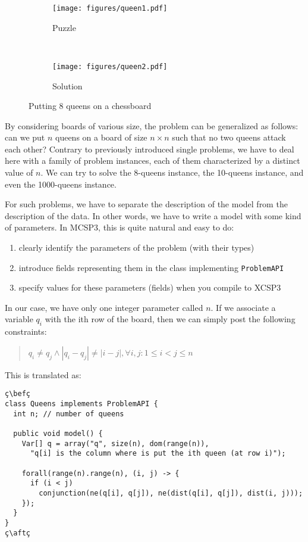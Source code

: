 \documentclass[10pt]{article}
\def\xt{{\rm XCSP3}\xspace}
\newcommand{\nn}[1]{{\tt #1}} %
\def\mt{{\rm MCSP3}\xspace}
\def\xt{{\rm XCSP3}\xspace}
\def\bef{\rule{10cm}{0.1mm}} %
\def\aft{\rule{10cm}{0.1mm}\medskip}
\begin{document}
\begin{figure}[h]
  \centering
    \begin{subfigure}[t]{0.5\textwidth}
        \centering
        \texttt{[image: figures/queen1.pdf]}
        \caption{Puzzle}
    \end{subfigure}%
    ~ 
    \begin{subfigure}[t]{0.5\textwidth}
        \centering
        \texttt{[image: figures/queen2.pdf]}
        \caption{Solution}
    \end{subfigure}
    \caption{Putting 8 queens on a chessboard \label{fig:queens}}
\end{figure}

By considering boards of various size, the problem can be generalized as follows: can we put $n$ queens on a board of size $n \times n$ such that no two queens attack each other?
Contrary to previously introduced single problems, we have to deal here with a family of problem instances, each of them characterized by a distinct value of $n$.
We can try to solve the 8-queens instance, the 10-queens instance, and even the 1000-queens instance.

For such problems, we have to separate the description of the model from the description of the data.
In other words, we have to write a model with some kind of parameters.
In \mt, this is quite natural and easy to do:
\begin{enumerate}
\item clearly identify the parameters of the problem (with their types)
\item introduce fields representing them in the class implementing \nn{ProblemAPI}
\item specify values for these parameters (fields) when you compile to \xt   
\end{enumerate}

In our case, we have only one integer parameter called $n$.
If we associate a variable $q_i$ with the ith row of the board, then we can simply post the following constraints:
\begin{quote}
  $q_i \neq q_j \land |q_i - q_j| \neq |i - j|, \forall i, j : 1 \leq i < j \leq n$
\end{quote}
This is translated as:

\begin{lstlisting}
ç\befç
class Queens implements ProblemAPI {
  int n; // number of queens

  public void model() {
    Var[] q = array("q", size(n), dom(range(n)),
      "q[i] is the column where is put the ith queen (at row i)");
    
    forall(range(n).range(n), (i, j) -> {
      if (i < j)
        conjunction(ne(q[i], q[j]), ne(dist(q[i], q[j]), dist(i, j)));
    });
  }
}
ç\aftç
\end{lstlisting}
\end{document}
